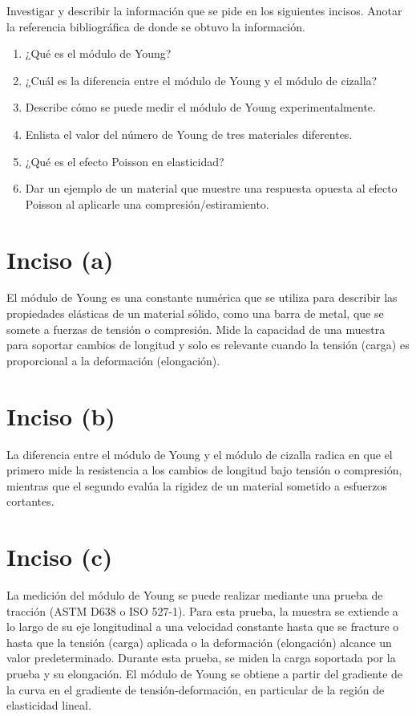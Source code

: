 \documentclass[../main.tex]{subfiles}
\begin{document}
\begin{problema}[3]
	Investigar y describir la información que se pide en los siguientes incisos.
	Anotar la referencia bibliográfica de donde se obtuvo la información.

	\begin{enumerate}
		\item ¿Qué es el módulo de Young?
		\item ¿Cuál es la diferencia entre el módulo de Young y el módulo
		      de cizalla?
		\item Describe cómo se puede medir el módulo de Young experimentalmente.
		\item Enlista el valor del número de Young de tres materiales diferentes.
		\item ¿Qué es el efecto Poisson en elasticidad?
		\item Dar un ejemplo de un material que muestre una respuesta opuesta
		      al efecto Poisson al aplicarle una compresión/estiramiento.
	\end{enumerate}

	\startsolution

	\section{Inciso (a)}

	El módulo de Young es una constante numérica que se utiliza para describir las
	propiedades elásticas de un material sólido, como una barra de metal, que se somete
	a fuerzas de tensión o compresión. Mide la capacidad de una muestra para soportar
	cambios de longitud y solo es relevante cuando la tensión (carga) es proporcional a
	la deformación (elongación).\cite{PruebaModuloYoungs2022}

	\section{Inciso (b)}

	La diferencia entre el módulo de Young y el módulo de cizalla radica en que el primero
	mide la resistencia a los cambios de longitud bajo tensión o compresión, mientras que
	el segundo evalúa la rigidez de un material sometido a esfuerzos cortantes.\cite{ModuloElasticidadQue2022}

	\section{Inciso (c)}

	La medición del módulo de Young se puede realizar mediante una prueba de tracción (ASTM D638 o ISO 527-1). Para esta prueba, la muestra se extiende a lo largo de su eje longitudinal
	a una velocidad constante hasta que se fracture o hasta que la tensión (carga) aplicada o la
	deformación (elongación) alcance un valor predeterminado. Durante esta prueba, se miden
	la carga soportada por la prueba y su elongación. El módulo de Young se obtiene a partir
	del gradiente de la curva en el gradiente de tensión-deformación, en particular de la
	región de elasticidad lineal.\cite{ASTMD638Caracteristicas,LordYounModulus,ISO527}


\end{problema}
\end{document}
